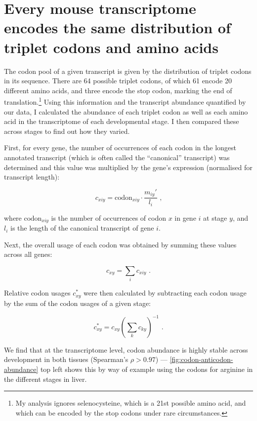 \section{Every mouse  transcriptome encodes the same distribution of
triplet codons and amino acids}

The codon pool of a given \mrna transcript is given by the distribution of
triplet codons in its sequence. There are \num{64} possible triplet codons, of
which \num{61} encode \num{20} different amino acids, and three encode the stop
codon, marking the end of translation.\footnote{My analysis ignores
selenocysteine, which is a \num{21}st possible amino acid, and which can be
encoded by the stop codons  under rare circumstances.} Using this
information and the transcript abundance quantified by our \rnaseq data, I
calculated the abundance of each triplet codon as well as each amino acid in the
transcriptome of each developmental stage. I then compared these across stages
to find out how they varied.

First, for every gene, the number of occurrences of each codon in the longest
annotated transcript (which is often called the “canonical” transcript) was
determined and this value was multiplied by the gene’s expression (normalised
for transcript length):

\begin{equation}
    c_{xiy} = \text{codon}_{xiy} \cdot \frac{m_{iy}'}{l_{i}} \text{\ ,}
\end{equation}

where \(\text{codon}_{xiy}\) is the number of occurrences of codon \(x\) in gene
\(i\) at stage \(y\), and \(l_i\) is the length of the canonical transcript of
gene \(i\).

Next, the overall usage of each codon was obtained by summing these values
across all genes:

\begin{equation}
    c_{xy} = \sum_i c_{xiy} \text{\ .}
\end{equation}

Relative codon usages \(c_{xy}^*\) were then calculated by subtracting each
codon usage by the sum of the codon usages of a given stage:

\begin{equation}
    c_{xy}^* = c_{xy}\left(\sum_k c_{ky}\right)^{-1} \text{\ .}
\end{equation}

We find that at the transcriptome level, codon abundance is highly stable across
development in both tissues (Spearman’s \(\rho > 0.97\)) ---
\cref{fig:codon-anticodon-abundance} top left shows this by way of example using
the codons for arginine in the different stages in liver.

